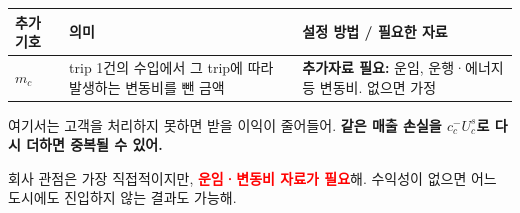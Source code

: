 \documentclass[11pt,a4paper]{article}
\begin{document}
\begin{longtable}{@{}P{0.12\textwidth}P{0.38\textwidth}P{0.42\textwidth}@{}}
\toprule
추가 기호 & 의미 & 설정 방법 / 필요한 자료 \\
\midrule
\endhead
$m_c$ & trip 1건의 수입에서 그 trip에 따라 발생하는 변동비를 뺀 금액 & \textbf{추가자료 필요:} 운임, 운행·에너지 등 변동비. 없으면 가정 \\
\bottomrule
\end{longtable}

여기서는 고객을 처리하지 못하면 받을 이익이 줄어들어. \textbf{같은 매출 손실을 $c_c^-U_c^s$로 다시 더하면 중복될 수 있어.}

회사 관점은 가장 직접적이지만, \textcolor{red}{\textbf{운임·변동비 자료가 필요}}해. 수익성이 없으면 어느 도시에도 진입하지 않는 결과도 가능해.
\end{document}
